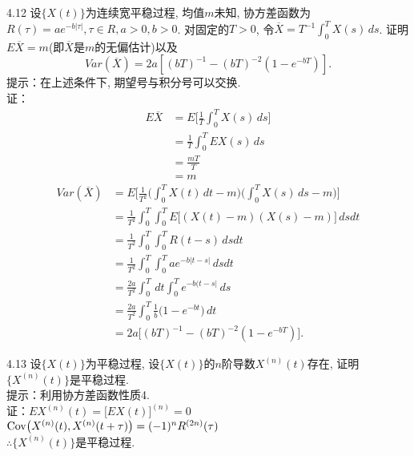 4.12 设$\{X(t)\}$为连续宽平稳过程, 均值$m$未知, 协方差函数为$R(\tau) = ae^{-b|\tau|}, \tau \in R, a > 0, b > 0$. 对固定的$T > 0$, 令$\overline{X} = T^{-1}\int^T_0X(s)\,ds$. 证明$E\overline{X} = m$(即$\overline{X}$是$m$的无偏估计)以及
\[
Var(\overline{X}) = 2a[(bT)^{-1}-(bT)^{-2}(1-e^{-bT})].
\]
提示：在上述条件下, 期望号与积分号可以交换.\\
证：
\[
\begin{split}
E\overline{X} & = E\big[\frac{1}{T}\int^T_0X(s)\,ds\big]\\
			& = \frac{1}{T}\int^T_0EX(s)\,ds\\
			& = \frac{mT}{T}\\
			& = m
\end{split}
\]
\[
\begin{split}
Var(\overline{X}) & = E\Bigg[\frac{1}{T^2}\bigg(\int^T_0X(t)\,dt - m\bigg)\bigg(\int^T_0X(s)\,ds - m\bigg)\Bigg]\\
				& = \frac{1}{T^2}\int^T_0\int^T_0E\big[(X(t)-m)(X(s)-m)\big]\,dsdt\\
				& = \frac{1}{T^2}\int^T_0\int^T_0R(t-s)\,dsdt\\
				& = \frac{1}{T^2}\int^T_0\int^T_0ae^{-b|t-s|}\,dsdt\\
				& = \frac{2a}{T^2}\int^T_0\,dt\int^T_0e^{-b(t-s|}\,ds\\
				& = \frac{2a}{T^2}\int^T_0\frac{1}{b}\big(1-e^{-bt}\big)\,dt\\
				& = 2a\big[(bT)^{-1}-(bT)^{-2}(1-e^{-bT})\big].
\end{split}
\]


4.13 设$\{X(t)\}$为平稳过程, 设$\{X(t)\}$的$n$阶导数$X^{(n)}(t)$存在, 证明$\{X^{(n)}(t)\}$是平稳过程.\\
提示：利用协方差函数性质4.\\
证：$EX^{(n)}(t) = \big[EX(t)\big]^{(n)} = 0$\\
	$\mathrm{Cov}\big(X^{(n)}(t), X^{(n)}(t+\tau)\big) = (-1)^nR^{(2n)}(\tau)$\\
	$\therefore \{X^{(n)}(t)\}$是平稳过程.\\



